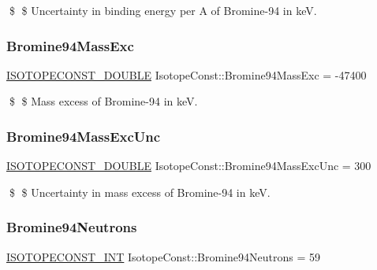 \$ \$ Uncertainty in binding energy per A of Bromine-\/94 in keV. \mbox{\label{group___isotope_const-_bromine-_br94_ga254e75a6583eb3d11d4a500a9435ebe6}} 
\subsubsection{\texorpdfstring{Bromine94\+Mass\+Exc}{Bromine94MassExc}}
{\footnotesize\ttfamily \mbox{\hyperlink{group___isotope_const-_macros_ga8f45a7272ce02c0b4c65c44636ed719a}{I\+S\+O\+T\+O\+P\+E\+C\+O\+N\+S\+T\+\_\+\+D\+O\+U\+B\+LE}} Isotope\+Const\+::\+Bromine94\+Mass\+Exc = -\/47400}

\$ \$ Mass excess of Bromine-\/94 in keV. \mbox{\label{group___isotope_const-_bromine-_br94_ga99201f96b334eed091155badc84f2a5c}} 
\subsubsection{\texorpdfstring{Bromine94\+Mass\+Exc\+Unc}{Bromine94MassExcUnc}}
{\footnotesize\ttfamily \mbox{\hyperlink{group___isotope_const-_macros_ga8f45a7272ce02c0b4c65c44636ed719a}{I\+S\+O\+T\+O\+P\+E\+C\+O\+N\+S\+T\+\_\+\+D\+O\+U\+B\+LE}} Isotope\+Const\+::\+Bromine94\+Mass\+Exc\+Unc = 300}

\$ \$ Uncertainty in mass excess of Bromine-\/94 in keV. \mbox{\label{group___isotope_const-_bromine-_br94_ga29408dc0a27cee82cabc5690a5eff371}} 
\subsubsection{\texorpdfstring{Bromine94\+Neutrons}{Bromine94Neutrons}}
{\footnotesize\ttfamily \mbox{\hyperlink{group___isotope_const-_macros_ga5f18360b3e99483a35c32d789e62621c}{I\+S\+O\+T\+O\+P\+E\+C\+O\+N\+S\+T\+\_\+\+I\+NT}} Isotope\+Const\+::\+Bromine94\+Neutrons = 59}

